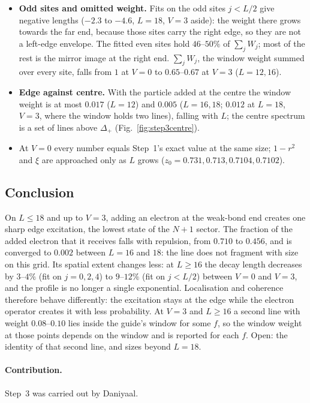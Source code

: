 \documentclass[11pt,a4paper]{article}
\begin{document}
\begin{itemize}
  \item \textbf{Odd sites and omitted weight.} Fits on the odd sites $j<L/2$ give negative lengths ($-2.3$ to $-4.6$, $L=18$, $V=3$ aside): the weight there grows towards the far end, because those sites carry the right edge, so they are not a left-edge envelope.
  The fitted even sites hold $46$--$50\%$ of $\sum_jW_j$; most of the rest is the mirror image at the right end.
  $\sum_jW_j$, the window weight summed over every site, falls from $1$ at $V=0$ to $0.65$--$0.67$ at $V=3$ ($L=12,16$).
  \item \textbf{Edge against centre.} With the particle added at the centre the window weight is at most $0.017$ ($L=12$) and $0.005$ ($L=16,18$; $0.012$ at $L=18$, $V=3$, where the window holds two lines), falling with $L$; the centre spectrum is a set of lines above $\Delta_+$ (Fig.~\ref{fig:step3centre}).
  \item At $V=0$ every number equals Step~1's exact value at the same size; $1-r^2$ and $\xi$ are approached only as $L$ grows ($z_0=0.731,0.713,0.7104,0.7102$).
\end{itemize}

\subsection{Conclusion}

On $L\le18$ and up to $V=3$, adding an electron at the weak-bond end creates one sharp edge excitation, the lowest state of the $N+1$ sector.
The fraction of the added electron that it receives falls with repulsion, from $0.710$ to $0.456$, and is converged to $0.002$ between $L=16$ and $18$: the line does not fragment with size on this grid.
Its spatial extent changes less: at $L\ge16$ the decay length decreases by $3$--$4\%$ (fit on $j=0,2,4$) to $9$--$12\%$ (fit on $j<L/2$) between $V=0$ and $V=3$, and the profile is no longer a single exponential.
Localisation and coherence therefore behave differently: the excitation stays at the edge while the electron operator creates it with less probability.
At $V=3$ and $L\ge16$ a second line with weight $0.08$--$0.10$ lies inside the guide's window for some $f$, so the window weight at those points depends on the window and is reported for each $f$.
Open: the identity of that second line, and sizes beyond $L=18$.

\paragraph{Contribution.} Step~3 was carried out by Daniyaal.
\end{document}
